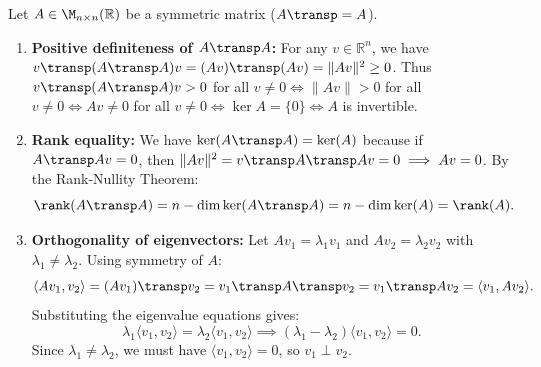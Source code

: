 \begin{exercisesolution}
\label{sol:symmetric_matrix_orthogonal_eigenvectors}
Let $A \in \M_{n \times n}(\mathbb{R})$ be a symmetric matrix ($A\transp = A$).
\begin{enumerate}[label=\textbf{(\alph*)}]
    \item \textbf{Positive definiteness of $A\transp A$:}
    For any $v \in \mathbb{R}^n$, we have $v\transp (A\transp A) v = (Av)\transp (Av) = \|Av\|^2 \ge 0$.
    Thus $v\transp (A\transp A) v > 0$ for all $v \ne 0 \iff \|Av\| > 0$ for all $v \ne 0 \iff Av \ne 0$ for all $v \ne 0 \iff \ker A = \{0\} \iff A$ is invertible.

    \item \textbf{Rank equality:}
    We have $\ker(A\transp A) = \ker(A)$ because if $A\transp A v = 0$, then $\|Av\|^2 = v\transp A\transp A v = 0 \implies Av = 0$.
    By the Rank-Nullity Theorem:
    \[
    \rank(A\transp A) = n - \dim\ker(A\transp A) = n - \dim\ker(A) = \rank(A).
    \]

    \item \textbf{Orthogonality of eigenvectors:}
    Let $Av_1 = \lambda_1 v_1$ and $Av_2 = \lambda_2 v_2$ with $\lambda_1 \ne \lambda_2$.
    Using symmetry of $A$:
    \[
    \langle Av_1, v_2 \rangle = (Av_1)\transp v_2 = v_1\transp A\transp v_2 = v_1\transp A v_2 = \langle v_1, Av_2 \rangle.
    \]
    Substituting the eigenvalue equations gives:
    \[
    \lambda_1 \langle v_1, v_2 \rangle = \lambda_2 \langle v_1, v_2 \rangle \implies (\lambda_1 - \lambda_2) \langle v_1, v_2 \rangle = 0.
    \]
    Since $\lambda_1 \ne \lambda_2$, we must have $\langle v_1, v_2 \rangle = 0$, so $v_1 \perp v_2$. \qedhere
\end{enumerate}
\end{exercisesolution}

